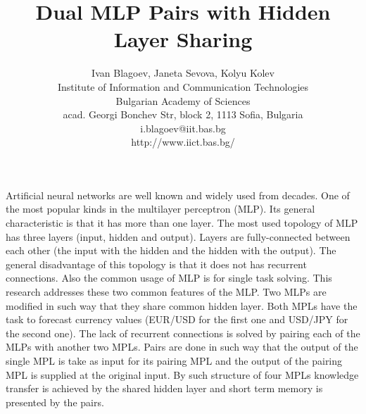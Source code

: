 \documentclass[12pt,a4paper]{article}
\title{\bf Dual MLP Pairs with Hidden Layer Sharing}
\author{Ivan Blagoev, Janeta Sevova, Kolyu Kolev \\
Institute of Information and Communication Technologies \\
Bulgarian Academy of Sciences \\
acad. Georgi Bonchev Str, block 2, 1113 Sofia, Bulgaria \\
i.blagoev@iit.bas.bg \\
http://www.iict.bas.bg/}
\date{}
\begin{document}
\maketitle

Artificial neural networks are well known and widely used from decades. One of the most popular kinds in the multilayer perceptron (MLP). Its general characteristic is that it has more than one layer. The most used topology of MLP has three layers (input, hidden and output). Layers are fully-connected between each other (the input with the hidden and the hidden with the output). The general disadvantage of this topology is that it does not has recurrent connections. Also the common usage of MLP is for single task solving. This research addresses these two common features of the MLP. Two MLPs are modified in such way that they share common hidden layer. Both MPLs have the task to forecast currency values (EUR/USD for the first one and USD/JPY for the second one). The lack of recurrent connections is solved by pairing each of the MLPs with another two MPLs. Pairs are done in such way that the output of the single MPL is take as input for its pairing MPL and the output of the pairing MPL is supplied at the original input. By such structure of four MPLs knowledge transfer is achieved by the shared hidden layer and short term memory is presented by the pairs. 
\end{document}
